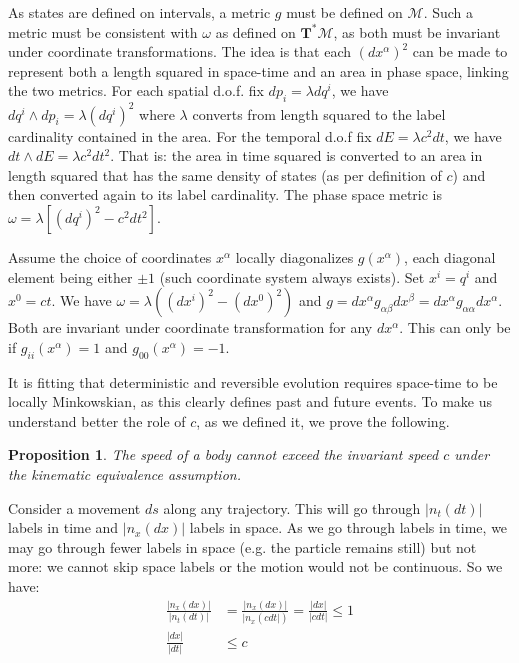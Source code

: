 \documentclass[aps,pra,10pt,twocolumn,floatfix,nofootinbib]{revtex4-1}
\newtheorem{prop}[thm]{Proposition}
\theoremstyle{definition}
\begin{document}
As states are defined on intervals, a metric $g$ must be defined on $\mathcal{M}$. Such a metric must be consistent with $\omega$ as defined on $\mathbf{T}^*\mathcal{M}$, as both must be invariant under coordinate transformations. The idea is that each $(dx^\alpha)^2$ can be made to represent both a length squared in space-time and an area in phase space, linking the two metrics. For each spatial d.o.f. fix $dp_i=\lambda dq^i$, we have $dq^i \wedge dp_i = \lambda (dq^i)^2$ where $\lambda$ converts from length squared to the label cardinality contained in the area. For the temporal d.o.f fix $dE = \lambda c^2 dt$, we have $dt \wedge dE = \lambda c^2 dt^2$. That is: the area in time squared is converted to an area in length squared that has the same density of states (as per definition of $c$) and then converted again to its label cardinality. The phase space metric is $\omega = \lambda [(dq^i)^2 - c^2 dt^2]$.

Assume the choice of coordinates $x^\alpha$ locally diagonalizes $g(x^\alpha)$, each diagonal element being either $\pm 1$ (such coordinate system always exists). Set $x^i=q^i$ and $x^0=ct$. We have $\omega = \lambda ((dx^i)^2 - (dx^0)^2)$ and $g=dx^\alpha g_{\alpha \beta} dx^\beta=dx^\alpha g_{\alpha \alpha}dx^\alpha$. Both are invariant under coordinate transformation for any $dx^\alpha$. This can only be if $g_{ii}(x^\alpha)=1$ and $g_{00}(x^\alpha)=-1$.

It is fitting that deterministic and reversible evolution requires space-time to be locally Minkowskian, as this clearly defines past and future events. To make us understand better the role of $c$, as we defined it, we prove the following.

\begin{prop}\label{speedLimit}
The speed of a body cannot exceed the invariant speed $c$ under the kinematic equivalence assumption.
\end{prop}

Consider a movement $ds$ along any trajectory. This will go through $|n_t(dt)|$ labels in time and $|n_x(dx)|$ labels in space. As we go through labels in time, we may go through fewer labels in space (e.g. the particle remains still) but not more: we cannot skip space labels or the motion would not be continuous. So we have:
\begin{align*}
\frac{|n_x(dx)|}{|n_t(dt)|} &= \frac{|n_x(dx)|}{|n_x(c dt|)} = \frac{|dx|}{|c dt|} \leq 1 \\
\frac{|dx|}{|dt|} & \leq c \\
\end{align*}
\end{document}
